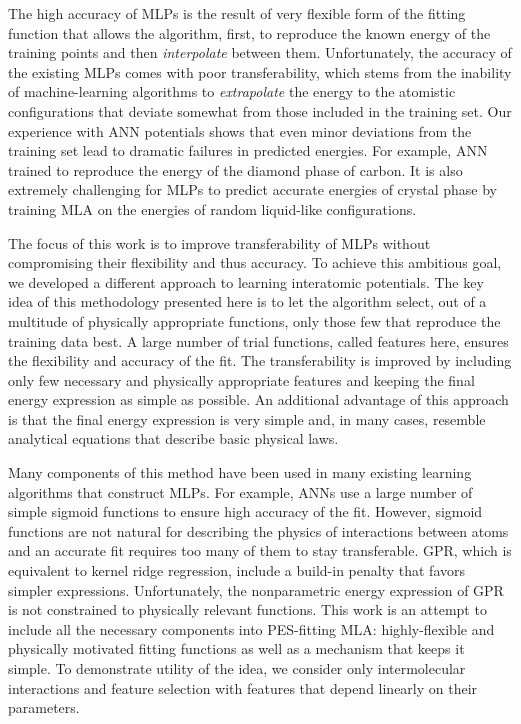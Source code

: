 \documentclass[aps,prl,reprint,amsmath,amssymb,nature]{revtex4-1}
\begin{document}
The high accuracy of MLPs is the result of very flexible form of the fitting function that allows the algorithm, first, to reproduce the 
known energy of the training points and then \textit{interpolate} between them. 
Unfortunately, the accuracy of the existing MLPs comes with poor transferability, which stems from the inability of machine-learning algorithms to \textit{extrapolate} the energy to the atomistic configurations that deviate somewhat from those included in 
the training set. 
Our experience with ANN potentials shows that even minor deviations from the training set lead to dramatic failures in 
predicted energies. 
\red For example, ANN trained to reproduce the energy of the diamond phase of carbon. \old
It is also extremely challenging for MLPs to predict accurate energies of crystal phase by training MLA on the energies of random liquid-like configurations. 

The focus of this work is to improve transferability of MLPs without compromising their flexibility and thus accuracy. 
To achieve this ambitious goal, we developed a different approach to learning interatomic potentials. 
The key idea of this methodology \red presented here \old is to let the algorithm select, out of a multitude of physically appropriate functions, only those few that reproduce the training data best. 
A large number of trial functions, called features here, ensures the flexibility and accuracy of the fit. 
The transferability is improved by including only few necessary and physically appropriate features and keeping the final energy expression as simple as possible. 
An additional advantage of this approach is that the final energy expression is very simple and, in many cases, resemble analytical equations that describe basic physical laws.

Many components of this method have been used in many existing learning algorithms that construct MLPs. 
For example, ANNs use a large number of simple sigmoid functions to ensure high accuracy of the fit. 
However, sigmoid functions are not natural for describing the physics of interactions between atoms and an accurate fit requires too many of them \red to stay transferable. \old
GPR, which is equivalent to kernel ridge regression, include a build-in penalty that favors simpler expressions. 
Unfortunately, the nonparametric energy expression of GPR is not constrained to physically relevant functions. 
This work is an attempt to include all the necessary components into PES-fitting MLA: highly-flexible and physically motivated fitting functions as well as a mechanism that keeps it simple. 
To demonstrate utility of the idea, we consider only intermolecular interactions and feature selection with features that depend linearly on their parameters.
\end{document}
